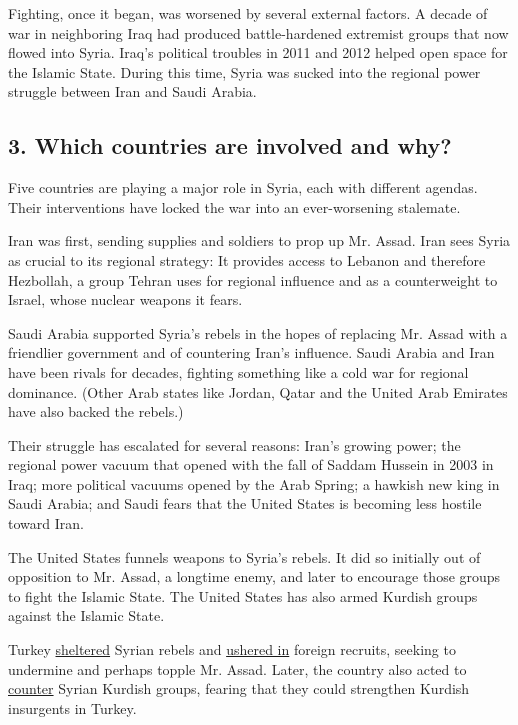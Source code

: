Fighting, once it began, was worsened by several external factors. A
decade of war in neighboring Iraq had produced battle-hardened extremist
groups that now flowed into Syria. Iraq's political troubles in 2011 and
2012 helped open space for the Islamic State. During this time, Syria
was sucked into the regional power struggle between Iran and Saudi
Arabia.

\hypertarget{3-which-countries-are-involved-and-why}{%
\subsection{\texorpdfstring{\textbf{3. Which countries are involved and
why?}}{3. Which countries are involved and why?}}\label{3-which-countries-are-involved-and-why}}

Five countries are playing a major role in Syria, each with different
agendas. Their interventions have locked the war into an ever-worsening
stalemate.

Iran was first, sending supplies and soldiers to prop up Mr. Assad. Iran
sees Syria as crucial to its regional strategy: It provides access to
Lebanon and therefore Hezbollah, a group Tehran uses for regional
influence and as a counterweight to Israel, whose nuclear weapons it
fears.

Saudi Arabia supported Syria's rebels in the hopes of replacing Mr.
Assad with a friendlier government and of countering Iran's influence.
Saudi Arabia and Iran have been rivals for decades, fighting something
like a cold war for regional dominance. (Other Arab states like Jordan,
Qatar and the United Arab Emirates have also backed the rebels.)

Their struggle has escalated for several reasons: Iran's growing power;
the regional power vacuum that opened with the fall of Saddam Hussein in
2003 in Iraq; more political vacuums opened by the Arab Spring; a
hawkish new king in Saudi Arabia; and Saudi fears that the United States
is becoming less hostile toward Iran.

The United States funnels weapons to Syria's rebels. It did so initially
out of opposition to Mr. Assad, a longtime enemy, and later to encourage
those groups to fight the Islamic State. The United States has also
armed Kurdish groups against the Islamic State.

Turkey
\href{http://www.nytimes3xbfgragh.onion/2011/10/28/world/europe/turkey-is-sheltering-antigovernment-syrian-militia.html}{sheltered}
Syrian rebels and
\href{http://www.nytimes3xbfgragh.onion/2015/03/10/world/europe/despite-crackdown-path-to-join-isis-often-winds-through-porous-turkish-border.html}{ushered
in} foreign recruits, seeking to undermine and perhaps topple Mr. Assad.
Later, the country also acted to
\href{http://www.nytimes3xbfgragh.onion/2016/06/30/world/middleeast/turkeys-twin-terrorist-threats-explained.html?rref=collection\%2Fcolumn\%2Fthe-interpreter\&action=click\&contentCollection=world\&region=stream\&module=stream_unit\&version=latest\&contentPlacement=20\&pgtype=collection}{counter}
Syrian Kurdish groups, fearing that they could strengthen Kurdish
insurgents in Turkey.

